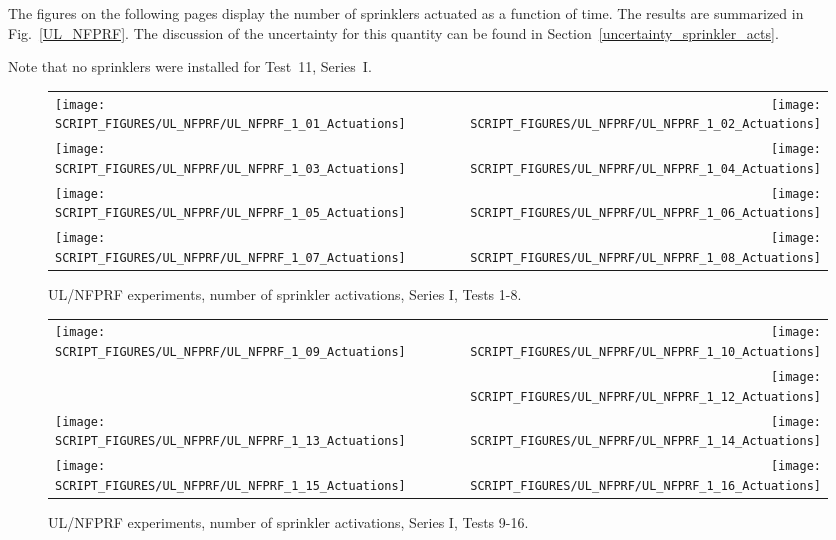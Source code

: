 The figures on the following pages display the number of sprinklers actuated as a function of time. The results are summarized in Fig.~\ref{UL_NFPRF}. The discussion of the uncertainty for this quantity can be found in Section~\ref{uncertainty_sprinkler_acts}.

Note that no sprinklers were installed for Test~11, Series~I.

\newpage

\begin{figure}[p]
\begin{tabular*}{\textwidth}{l@{\extracolsep{\fill}}r}
\texttt{[image: SCRIPT\_FIGURES/UL\_NFPRF/UL\_NFPRF\_1\_01\_Actuations]} &
\texttt{[image: SCRIPT\_FIGURES/UL\_NFPRF/UL\_NFPRF\_1\_02\_Actuations]} \\
\texttt{[image: SCRIPT\_FIGURES/UL\_NFPRF/UL\_NFPRF\_1\_03\_Actuations]} &
\texttt{[image: SCRIPT\_FIGURES/UL\_NFPRF/UL\_NFPRF\_1\_04\_Actuations]} \\
\texttt{[image: SCRIPT\_FIGURES/UL\_NFPRF/UL\_NFPRF\_1\_05\_Actuations]} &
\texttt{[image: SCRIPT\_FIGURES/UL\_NFPRF/UL\_NFPRF\_1\_06\_Actuations]} \\
\texttt{[image: SCRIPT\_FIGURES/UL\_NFPRF/UL\_NFPRF\_1\_07\_Actuations]} &
\texttt{[image: SCRIPT\_FIGURES/UL\_NFPRF/UL\_NFPRF\_1\_08\_Actuations]} \\
\end{tabular*}
\caption{UL/NFPRF experiments, number of sprinkler activations, Series I, Tests 1-8.}
\label{UL_NFPRF_1}
\end{figure}

\begin{figure}[p]
\begin{tabular*}{\textwidth}{l@{\extracolsep{\fill}}r}
\texttt{[image: SCRIPT\_FIGURES/UL\_NFPRF/UL\_NFPRF\_1\_09\_Actuations]} &
\texttt{[image: SCRIPT\_FIGURES/UL\_NFPRF/UL\_NFPRF\_1\_10\_Actuations]} \\
&
\texttt{[image: SCRIPT\_FIGURES/UL\_NFPRF/UL\_NFPRF\_1\_12\_Actuations]} \\
\texttt{[image: SCRIPT\_FIGURES/UL\_NFPRF/UL\_NFPRF\_1\_13\_Actuations]} &
\texttt{[image: SCRIPT\_FIGURES/UL\_NFPRF/UL\_NFPRF\_1\_14\_Actuations]} \\
\texttt{[image: SCRIPT\_FIGURES/UL\_NFPRF/UL\_NFPRF\_1\_15\_Actuations]} &
\texttt{[image: SCRIPT\_FIGURES/UL\_NFPRF/UL\_NFPRF\_1\_16\_Actuations]} \\
\end{tabular*}
\caption{UL/NFPRF experiments, number of sprinkler activations, Series I, Tests 9-16.}
\label{UL_NFPRF_2}
\end{figure}

